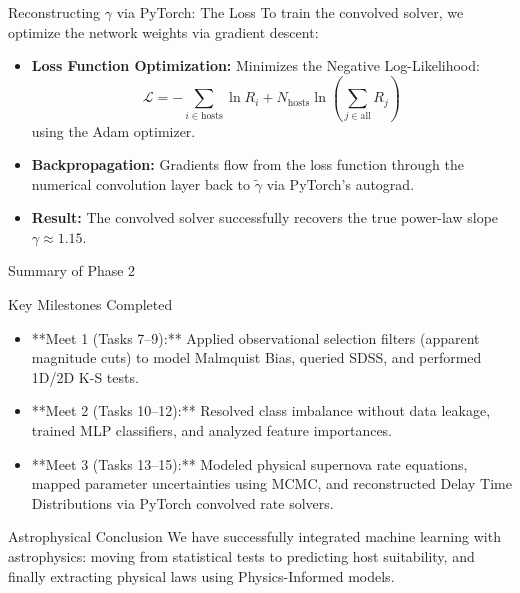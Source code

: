 \documentclass[9pt]{beamer}
\begin{document}
\begin{frame}{Reconstructing $\gamma$ via PyTorch: The Loss}
  To train the convolved solver, we optimize the network weights via gradient descent:
  \begin{itemize}
    \item \textbf{Loss Function Optimization:} Minimizes the Negative Log-Likelihood:
      $$\mathcal{L} = -\sum_{i \in \text{hosts}} \ln R_i + N_{\text{hosts}} \ln \left( \sum_{j \in \text{all}} R_j \right)$$
      using the Adam optimizer.
    \item \textbf{Backpropagation:} Gradients flow from the loss function through the numerical convolution layer back to $\tilde{\gamma}$ via PyTorch's autograd.
    \item \textbf{Result:} The convolved solver successfully recovers the true power-law slope $\gamma \approx 1.15$.
  \end{itemize}
\end{frame}

\begin{frame}{Summary of Phase 2}
  \begin{block}{Key Milestones Completed}
    \begin{itemize}
      \item **Meet 1 (Tasks 7--9):** Applied observational selection filters (apparent magnitude cuts) to model Malmquist Bias, queried SDSS, and performed 1D/2D K-S tests.
      \item **Meet 2 (Tasks 10--12):** Resolved class imbalance without data leakage, trained MLP classifiers, and analyzed feature importances.
      \item **Meet 3 (Tasks 13--15):** Modeled physical supernova rate equations, mapped parameter uncertainties using MCMC, and reconstructed Delay Time Distributions via PyTorch convolved rate solvers.
    \end{itemize}
  \end{block}
  \begin{exampleblock}{Astrophysical Conclusion}
    We have successfully integrated machine learning with astrophysics: moving from statistical tests to predicting host suitability, and finally extracting physical laws using Physics-Informed models.
  \end{exampleblock}
\end{frame}
\end{document}
